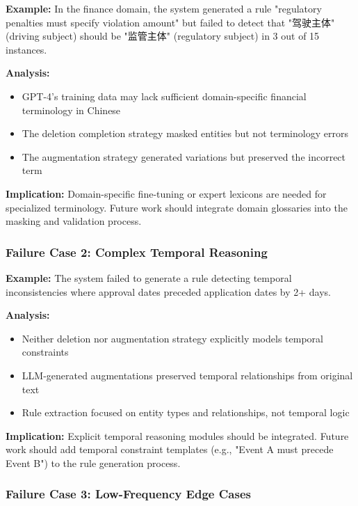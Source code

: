 \documentclass[runningheads]{llncs}
\begin{document}
\textbf{Example:} In the finance domain, the system generated a rule "regulatory penalties must specify violation amount" but failed to detect that "驾驶主体" (driving subject) should be "监管主体" (regulatory subject) in 3 out of 15 instances.

\textbf{Analysis:}
\begin{itemize}
    \item GPT-4's training data may lack sufficient domain-specific financial terminology in Chinese
    \item The deletion completion strategy masked entities but not terminology errors
    \item The augmentation strategy generated variations but preserved the incorrect term
\end{itemize}

\textbf{Implication:} Domain-specific fine-tuning or expert lexicons are needed for specialized terminology. Future work should integrate domain glossaries into the masking and validation process.

\subsubsection{Failure Case 2: Complex Temporal Reasoning}

\textbf{Example:} The system failed to generate a rule detecting temporal inconsistencies where approval dates preceded application dates by 2+ days.

\textbf{Analysis:}
\begin{itemize}
    \item Neither deletion nor augmentation strategy explicitly models temporal constraints
    \item LLM-generated augmentations preserved temporal relationships from original text
    \item Rule extraction focused on entity types and relationships, not temporal logic
\end{itemize}

\textbf{Implication:} Explicit temporal reasoning modules should be integrated. Future work should add temporal constraint templates (e.g., "Event A must precede Event B") to the rule generation process.

\subsubsection{Failure Case 3: Low-Frequency Edge Cases}
\end{document}
